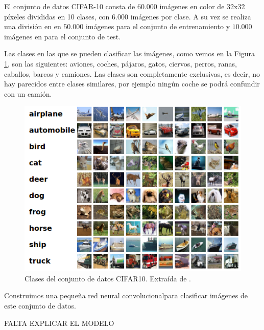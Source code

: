 \documentclass[
  a4paper,
  12pt,
  spanish,
]{scrartcl}
\theoremstyle{teorema-style}
\begin{document}
El conjunto de datos CIFAR-10 \parencite{rizhevsky_learning_2009} consta de $60.000$ imágenes en color de 32x32 píxeles divididas en 10 clases, con $6.000$ imágenes por clase. A su vez se realiza una división en en $50.000$ imágenes para el conjunto de entrenamiento y $10.000$ imágenes en para el conjunto de test.

Las clases en las que se pueden clasificar las imágenes, como vemos en la Figura \ref{fig:cifar10}, son las siguientes: aviones, coches, pájaros, gatos, ciervos, perros, ranas, caballos, barcos y camiones. Las clases son completamente exclusivas, es decir, no hay parecidos entre clases similares, por ejemplo ningún coche se podrá confundir con un camión.

\begin{figure}[h]
  \centering
  \includegraphics[width=.7\textwidth]{img/cifar10}
  \caption{Clases del conjunto de datos CIFAR10. Extraída de \parencite{rizhevsky_cifar_2013}.}
  \label{fig:cifar10}
\end{figure}

Construimos una pequeña red neural convolucional\footnotemark para clasificar imágenes de este conjunto de datos.

FALTA EXPLICAR EL MODELO

\end{document}
